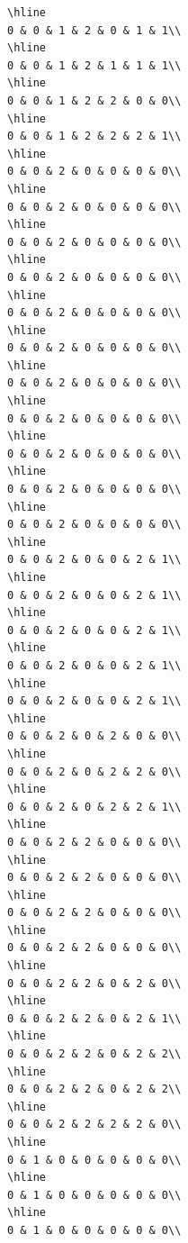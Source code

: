 \documentclass[
]{article}
\begin{document}
\begin{verbatim}
\hline
0 & 0 & 1 & 2 & 0 & 1 & 1\\
\hline
0 & 0 & 1 & 2 & 1 & 1 & 1\\
\hline
0 & 0 & 1 & 2 & 2 & 0 & 0\\
\hline
0 & 0 & 1 & 2 & 2 & 2 & 1\\
\hline
0 & 0 & 2 & 0 & 0 & 0 & 0\\
\hline
0 & 0 & 2 & 0 & 0 & 0 & 0\\
\hline
0 & 0 & 2 & 0 & 0 & 0 & 0\\
\hline
0 & 0 & 2 & 0 & 0 & 0 & 0\\
\hline
0 & 0 & 2 & 0 & 0 & 0 & 0\\
\hline
0 & 0 & 2 & 0 & 0 & 0 & 0\\
\hline
0 & 0 & 2 & 0 & 0 & 0 & 0\\
\hline
0 & 0 & 2 & 0 & 0 & 0 & 0\\
\hline
0 & 0 & 2 & 0 & 0 & 0 & 0\\
\hline
0 & 0 & 2 & 0 & 0 & 0 & 0\\
\hline
0 & 0 & 2 & 0 & 0 & 0 & 0\\
\hline
0 & 0 & 2 & 0 & 0 & 2 & 1\\
\hline
0 & 0 & 2 & 0 & 0 & 2 & 1\\
\hline
0 & 0 & 2 & 0 & 0 & 2 & 1\\
\hline
0 & 0 & 2 & 0 & 0 & 2 & 1\\
\hline
0 & 0 & 2 & 0 & 0 & 2 & 1\\
\hline
0 & 0 & 2 & 0 & 2 & 0 & 0\\
\hline
0 & 0 & 2 & 0 & 2 & 2 & 0\\
\hline
0 & 0 & 2 & 0 & 2 & 2 & 1\\
\hline
0 & 0 & 2 & 2 & 0 & 0 & 0\\
\hline
0 & 0 & 2 & 2 & 0 & 0 & 0\\
\hline
0 & 0 & 2 & 2 & 0 & 0 & 0\\
\hline
0 & 0 & 2 & 2 & 0 & 0 & 0\\
\hline
0 & 0 & 2 & 2 & 0 & 2 & 0\\
\hline
0 & 0 & 2 & 2 & 0 & 2 & 1\\
\hline
0 & 0 & 2 & 2 & 0 & 2 & 2\\
\hline
0 & 0 & 2 & 2 & 0 & 2 & 2\\
\hline
0 & 0 & 2 & 2 & 2 & 2 & 0\\
\hline
0 & 1 & 0 & 0 & 0 & 0 & 0\\
\hline
0 & 1 & 0 & 0 & 0 & 0 & 0\\
\hline
0 & 1 & 0 & 0 & 0 & 0 & 0\\

\end{verbatim}
\end{document}
